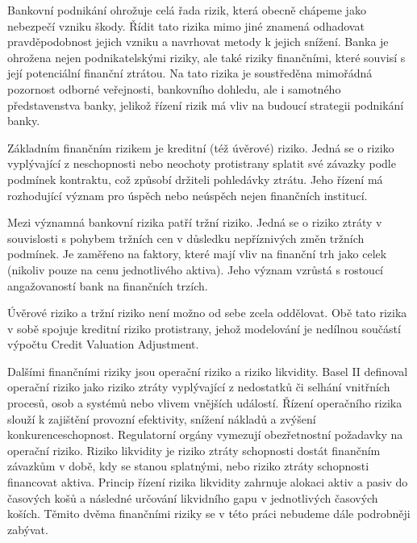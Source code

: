 \documentclass[a4paper,12pt]{report}
\theoremstyle{definition} \newtheorem{definice}[veta]{Definice}
\theoremstyle{remark}
\begin{document}
Bankovní podnikání ohrožuje celá řada rizik, která obecně chápeme jako nebezpečí vzniku škody. 
Řídit tato rizika mimo jiné znamená odhadovat pravděpodobnost jejich vzniku a navrhovat metody k jejich snížení.
Banka je ohrožena nejen podnikatelskými riziky, ale také riziky finančními, které souvisí s její potenciální finanční ztrátou. 
Na tato rizika je soustředěna mimořádná pozornost odborné veřejnosti, bankovního dohledu, ale i samotného představenstva banky, jelikož řízení rizik má vliv na budoucí strategii podnikání banky.

Základním finančním rizikem je kreditní (též úvěrové) riziko.
Jedná se o riziko vyplývající z neschopnosti nebo neochoty protistrany splatit své závazky podle podmínek
kontraktu, což způsobí držiteli pohledávky ztrátu.
Jeho řízení má rozhodující význam pro úspěch nebo neúspěch nejen finančních institucí. 

Mezi významná bankovní rizika patří tržní riziko. 
Jedná se o riziko ztráty v souvislosti s pohybem tržních cen v důsledku nepříznivých změn tržních podmínek. 
Je zaměřeno na faktory, které mají vliv na finanční trh jako celek (nikoliv pouze na cenu jednotlivého aktiva).
Jeho význam vzrůstá s rostoucí angažovaností bank na finančních trzích. 

Úvěrové riziko a tržní riziko není možno od sebe zcela oddělovat.
Obě tato rizika v sobě spojuje kreditní riziko protistrany, jehož modelování je nedílnou součástí výpočtu Credit Valuation Adjustment. 

Dalšími finančními riziky jsou operační riziko a riziko likvidity.
Basel II %
definoval operační riziko jako riziko ztráty vyplývající z nedostatků či selhání vnitřních procesů, osob a systémů nebo vlivem vnějších událostí.
Řízení operačního rizika slouží k zajištění provozní efektivity, snížení nákladů a zvýšení konkurenceschopnost.
Regulatorní orgány vymezují obezřetnostní požadavky na operační riziko.
Riziko likvidity je %
riziko ztráty schopnosti dostát finančním závazkům v době, kdy se stanou splatnými, nebo riziko ztráty schopnosti financovat aktiva.
Princip řízení rizika likvidity zahrnuje alokaci aktiv a pasiv do časových košů a následné určování likvidního gapu v jednotlivých časových koších. 
Těmito dvěma finančními riziky se v této práci nebudeme dále podrobněji zabývat.
\end{document}
